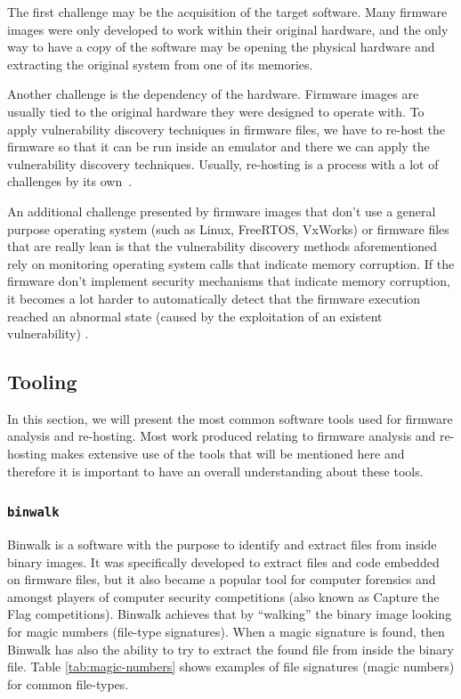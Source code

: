 The first challenge may be the acquisition of the target software. Many firmware images were only developed to work within their original hardware, and the only way to have a copy of the software may be opening the physical hardware and extracting the original system from one of its memories.

Another challenge is the dependency of the hardware. Firmware images are usually tied to the original hardware they were designed to operate with. To apply vulnerability discovery techniques in firmware files, we have to re-host the firmware so that it can be run inside an emulator and there we can apply the vulnerability discovery techniques. Usually, re-hosting is a process with a lot of challenges by its own~\cite{firmware-challenges}.

An additional challenge presented by firmware images that don't use a general purpose operating system (such as Linux, FreeRTOS, VxWorks) or firmware files that are really lean is that the vulnerability discovery methods aforementioned rely on monitoring operating system calls that indicate memory corruption. If the firmware don't implement security mechanisms that indicate memory corruption, it becomes a lot harder to automatically detect that the firmware execution reached an abnormal state (caused by the exploitation of an existent vulnerability) \cite{wycinwyc}.

\subsection{Tooling}

In this section, we will present the most common software tools used for firmware analysis and re-hosting. Most work produced relating to firmware analysis and re-hosting makes extensive use of the tools that will be mentioned here and therefore it is important to have an overall understanding about these tools.

\subsubsection{ {\tt binwalk} }

Binwalk \cite{github:binwalk} is a software with the purpose to identify and extract files from inside binary images. It was specifically developed to extract files and code embedded on firmware files, but it also became a popular tool for computer forensics and amongst players of computer security competitions (also known as Capture the Flag competitions). Binwalk achieves that by ``walking'' the binary image looking for magic numbers (file-type signatures). When a magic signature is found, then Binwalk has also the ability to try to extract the found file from inside the binary file. Table \ref{tab:magic-numbers} shows examples of file signatures (magic numbers) for common file-types.

